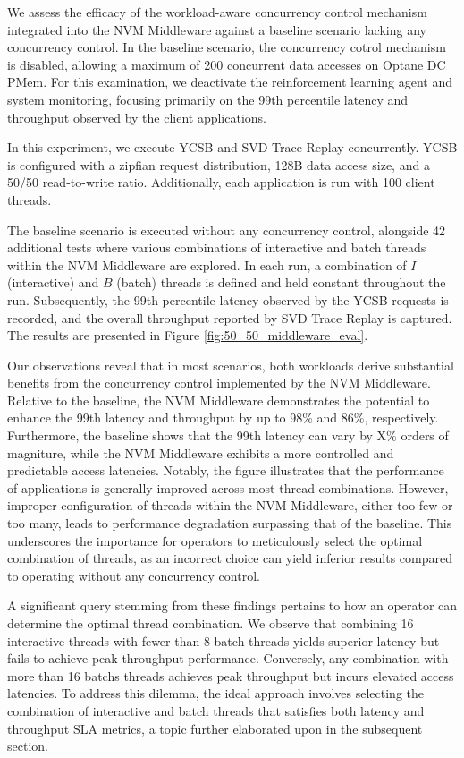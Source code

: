 We assess the efficacy of the workload-aware concurrency control mechanism integrated into the NVM Middleware against a baseline scenario lacking any concurrency control. In the baseline scenario, the concurrency cotrol mechanism is disabled, allowing a maximum of 200 concurrent data accesses on Optane DC PMem. For this examination, we deactivate the reinforcement learning agent and system monitoring, focusing primarily on the 99th percentile latency and throughput observed by the client applications.

In this experiment, we execute YCSB and SVD Trace Replay concurrently. YCSB is configured with a zipfian request distribution, 128B data access size, and a 50/50 read-to-write ratio. Additionally, each application is run with 100 client threads.

The baseline scenario is executed without any concurrency control, alongside 42 additional tests where various combinations of interactive and batch threads within the NVM Middleware are explored. In each run, a combination of $I$ (interactive) and $B$ (batch) threads is defined and held constant throughout the run. Subsequently, the 99th percentile latency observed by the YCSB requests is recorded, and the overall throughput reported by SVD Trace Replay is captured. The results are presented in Figure \ref{fig:50_50_middleware_eval}.

Our observations reveal that in most scenarios, both workloads derive substantial benefits from the concurrency control implemented by the NVM Middleware. Relative to the baseline, the NVM Middleware demonstrates the potential to enhance the 99th latency and throughput by up to 98\% and 86\%, respectively. Furthermore, the baseline shows that the 99th latency can vary by X\% orders of magniture, while the NVM Middleware exhibits a more controlled and predictable access latencies. Notably, the figure illustrates that the performance of applications is generally improved across most thread combinations. However, improper configuration of threads within the NVM Middleware, either too few or too many, leads to performance degradation surpassing that of the baseline. This underscores the importance for operators to meticulously select the optimal combination of threads, as an incorrect choice can yield inferior results compared to operating without any concurrency control.

A significant query stemming from these findings pertains to how an operator can determine the optimal thread combination. We observe that combining 16 interactive threads with fewer than 8 batch threads yields superior latency but fails to achieve peak throughput performance. Conversely, any combination with more than 16 batchs threads achieves peak throughput but incurs elevated access latencies. To address this dilemma, the ideal approach involves selecting the combination of interactive and batch threads that satisfies both latency and throughput SLA metrics, a topic further elaborated upon in the subsequent section.

